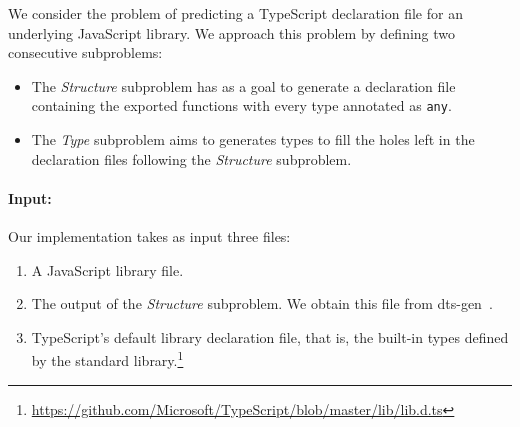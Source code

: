 \documentclass[sigplan,10pt,review,anonymous]{acmart} %
\theoremstyle{plain}
\theoremstyle{remark}
\theoremstyle{definition}
\begin{document}

We consider the problem of predicting a TypeScript declaration file
for an underlying JavaScript library. We approach this problem by defining
two consecutive subproblems:
\begin{itemize}[label=\raisebox{0.25ex}{\tiny$\bullet$}]
  \item The \textit{Structure} subproblem 
  has as a goal to generate a declaration file containing the exported functions with every type annotated as \texttt{any}.
  \item The \textit{Type} subproblem aims to generates types
  to fill the holes left in the declaration files
  following the \textit{Structure} subproblem.
\end{itemize}

\paragraph{Input:}
Our implementation takes as input three files:
\begin{enumerate}
	\item A JavaScript library file.
	\item The output of the \textit{Structure} subproblem.
	      We obtain this file from dts-gen~\cite{dtsgen}.
	\item TypeScript's default library declaration file,
	      that is, the built-in types defined by the standard library.\footnote{\url{https://github.com/Microsoft/TypeScript/blob/master/lib/lib.d.ts}}
\end{enumerate}
%
\end{document}

